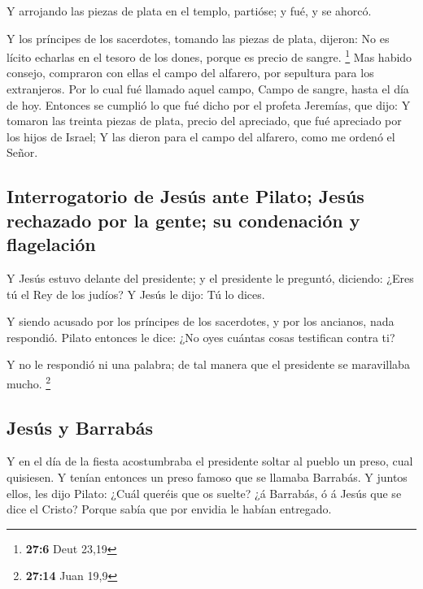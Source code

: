 Y arrojando las piezas de plata en el templo, partióse; y
fué, y se ahorcó.

 Y los príncipes de los sacerdotes, tomando las piezas de
plata, dijeron: No es lícito echarlas en el tesoro de los dones, porque
es precio de sangre. \footnote{\textbf{27:6} Deut 23,19} 
Mas habido consejo, compraron con ellas el campo del alfarero, por
sepultura para los extranjeros.  Por lo cual fué llamado
aquel campo, Campo de sangre, hasta el día de hoy. 
Entonces se cumplió lo que fué dicho por el profeta Jeremías, que dijo:
Y tomaron las treinta piezas de plata, precio del apreciado, que fué
apreciado por los hijos de Israel;  Y las dieron para el
campo del alfarero, como me ordenó el Señor.

\hypertarget{interrogatorio-de-jesuxfas-ante-pilato-jesuxfas-rechazado-por-la-gente-su-condenaciuxf3n-y-flagelaciuxf3n}{%
\subsection{Interrogatorio de Jesús ante Pilato; Jesús rechazado por la
gente; su condenación y
flagelación}\label{interrogatorio-de-jesuxfas-ante-pilato-jesuxfas-rechazado-por-la-gente-su-condenaciuxf3n-y-flagelaciuxf3n}}

 Y Jesús estuvo delante del presidente; y el presidente
le preguntó, diciendo: ¿Eres tú el Rey de los judíos? Y Jesús le dijo:
Tú lo dices.

 Y siendo acusado por los príncipes de los sacerdotes, y
por los ancianos, nada respondió.  Pilato entonces le
dice: ¿No oyes cuántas cosas testifican contra ti?

 Y no le respondió ni una palabra; de tal manera que el
presidente se maravillaba mucho. \footnote{\textbf{27:14} Juan 19,9}

\hypertarget{jesuxfas-y-barrabuxe1s}{%
\subsection{Jesús y Barrabás}\label{jesuxfas-y-barrabuxe1s}}

 Y en el día de la fiesta acostumbraba el presidente
soltar al pueblo un preso, cual quisiesen.  Y tenían
entonces un preso famoso que se llamaba Barrabás.  Y
juntos ellos, les dijo Pilato: ¿Cuál queréis que os suelte? ¿á Barrabás,
ó á Jesús que se dice el Cristo?  Porque sabía que por
envidia le habían entregado.

